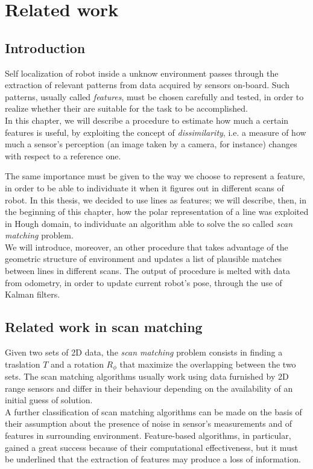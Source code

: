 \documentclass[a4paper, onecolumn]{report}
\begin{document}
\tableofcontents
\newpage

\chapter{Related work}
\section{Introduction}
Self localization of robot inside a unknow environment passes through the extraction of relevant patterns from data acquired by sensors on-board. Such patterns, usually called \emph{features}, must be chosen carefully and tested, in order to realize whether their are suitable for the task to be accomplished. \\
In this chapter, we will describe a procedure to estimate how much a certain features is useful, by exploiting the concept of \emph{dissimilarity}, i.e. a measure of how much a sensor's perception (an image taken by a camera, for instance) changes with respect to a reference one.

The same importance must be given to the way we choose to represent a feature, in order to be able to individuate it when it figures out in different scans of robot. In this thesis, we decided to use lines as features; we will describe, then, in the beginning of this chapter, how the polar representation of a line was exploited in Hough domain, to individuate an algorithm able to solve the so called \emph{scan matching} problem. \\ 
We will introduce, moreover, an other procedure that takes advantage of the geometric structure of environment and updates a list of plausible matches between lines in different scans. The output of procedure is melted with data from odometry, in order to update current robot's pose, through the use of Kalman filters.

\section{Related work in scan matching}
Given two sets of 2D data, the \emph{scan matching} problem consists in finding a traslation $T$ and a rotation $R_\phi$ that maximize the overlapping between the two sets. The scan matching algorithms usually work using data furnished by 2D range sensors and differ in their behaviour depending on the availability of an initial guess of solution. \\
A further classification of scan matching algorithms can be made on the basis of their assumption about the presence of noise in sensor's measurements and of features in surrounding environment. Feature-based algorithms, in particular, gained a great success because of their computational effectiveness, but it must be underlined that the extraction of features may produce a loss of information. 
\end{document}
